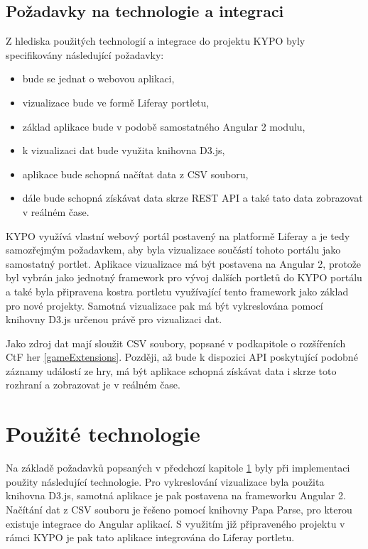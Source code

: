\documentclass[
  digital, %
  oneside, %
  table,   %
  nolof,     %
  nolot,     %
]{fithesis3}
\begin{document}
\section{Požadavky na technologie a integraci} \label{technologyRequirements}
Z hlediska použitých technologií a integrace do projektu KYPO byly specifikovány následující požadavky:
\begin{itemize}
  \item bude se jednat o webovou aplikaci,
  \item vizualizace bude ve formě Liferay portletu,
  \item základ aplikace bude v podobě samostatného Angular 2 modulu,
  \item k vizualizaci dat bude využita knihovna D3.js,
  \item aplikace bude schopná načítat data z CSV souboru,
  \item dále bude schopná získávat data skrze REST API a také tato data zobrazovat v reálném čase.
\end{itemize}
KYPO využívá vlastní webový portál postavený na platformě Liferay a je tedy samozřejmým požadavkem, aby byla vizualizace součástí tohoto portálu jako samostatný portlet. Aplikace vizualizace má být postavena na Angular 2, protože byl vybrán jako jednotný framework pro vývoj dalších portletů do KYPO portálu a také byla připravena kostra portletu využívající tento framework jako základ pro nové projekty. Samotná vizualizace pak má být vykreslována pomocí knihovny D3.js určenou právě pro vizualizaci dat.\par
Jako zdroj dat mají sloužit CSV soubory, popsané v podkapitole o rozšířeních CtF her \ref{gameExtensions}. Později, až bude k dispozici API poskytující podobné záznamy událostí ze hry, má být aplikace schopná získávat data i skrze toto rozhraní a zobrazovat je v reálném čase.

\chapter{Použité technologie}
Na základě požadavků popsaných v předchozí kapitole \ref{technologyRequirements} byly při implementaci použity následující technologie. Pro vykreslování vizualizace byla použita knihovna D3.js, samotná aplikace je pak postavena na frameworku Angular 2. Načítání dat z CSV souboru je řešeno pomocí knihovny Papa Parse, pro kterou existuje integrace do Angular aplikací. S využitím již připraveného projektu v rámci KYPO je pak tato aplikace integrována do Liferay portletu.
\end{document}
